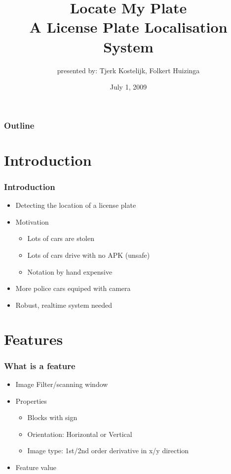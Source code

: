 \documentclass{beamer}
\title{Locate My Plate \\ A License Plate Localisation System}
\subtitle{presented by: Tjerk Kostelijk, Folkert Huizinga}
\date{July 1, 2009}
\begin{document}
\frame{\titlepage}

\setcounter{tocdepth}{1}

\frame
{
  \frametitle{Outline}
  \small
  \tableofcontents
  \normalsize
}

\setcounter{tocdepth}{2}



\section{Introduction}
\frame
{
  \frametitle{Introduction}
	
  \begin{itemize}
  \item <+-| alert@+> Detecting the location of a license plate 
  \item <+-| alert@+> Motivation
  \begin{itemize}
		\item <+-| alert@+> Lots of cars are stolen
		\item <+-| alert@+> Lots of cars drive with no APK (unsafe)
		\item <+-| alert@+> Notation by hand expensive
  \end{itemize}
	\item <+-| alert@+> More police cars equiped with camera 
  \item <+-| alert@+> Robust, realtime system needed
  \end{itemize}
}

\section{Features}
\frame
{
  \frametitle{What is a feature}
	
  \begin{itemize}
  \item <+-| alert@+> Image Filter/scanning window
  \item <+-| alert@+> Properties
		\begin{itemize}
			\item <+-| alert@+> Blocks with sign 
			\item <+-| alert@+> Orientation: Horizontal or Vertical
			\item <+-| alert@+> Image type: 1st/2nd order derivative in x/y direction
		\end{itemize}
  \item <+-| alert@+> Feature value
  \end{itemize}
}
\end{document}
